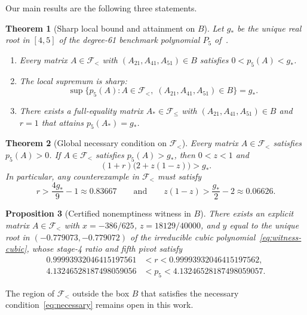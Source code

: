 \documentclass[11pt]{article}
\newtheorem{theorem}{Theorem}[section]
\newtheorem{proposition}[theorem]{Proposition}
\theoremstyle{remark}
\begin{document}
Our main results are the following three statements.

\begin{theorem}[Sharp local bound and attainment on $B$]\label{thm:box}
Let $g_*$ be the unique real root in $[4,5]$ of the degree-61 benchmark
polynomial $P_5$ of~\cite[eq.~(2.15)]{CEU2026}.
\begin{enumerate}
  \item Every matrix $A\in\mathcal{F}_{<}$ with $(A_{21},A_{41},A_{51})\in B$
  satisfies $0 < p_5(A) < g_*$.
  \item The local supremum is sharp:
  \[
    \sup\bigl\{p_5(A) : A\in\mathcal{F}_{<},\; (A_{21},A_{41},A_{51})\in B\bigr\} = g_*.
  \]
  \item There exists a full-equality matrix $A_*\in\mathcal{F}_{\le}$ with
  $(A_{21},A_{41},A_{51})\in B$ and $r=1$ that attains $p_5(A_*)=g_*$.
\end{enumerate}
\end{theorem}

\begin{theorem}[Global necessary condition on $\mathcal{F}_{<}$]\label{thm:global}
Every matrix $A\in\mathcal{F}_{<}$ satisfies $p_5(A)>0$. If $A\in\mathcal{F}_{<}$
satisfies $p_5(A) > g_*$, then $0 < z < 1$ and
\begin{equation}\label{eq:necessary}
  (1+r)\bigl(2+z(1-z)\bigr) > g_*.
\end{equation}
In particular, any counterexample in $\mathcal{F}_{<}$ must satisfy
\[
  r > \frac{4g_*}{9} - 1 \approx 0.83667
  \qquad\text{and}\qquad
  z(1-z) > \frac{g_*}{2} - 2 \approx 0.06626.
\]
\end{theorem}

\begin{proposition}[Certified nonemptiness witness in $B$]\label{prop:witness}
There exists an explicit matrix $A\in\mathcal{F}_{<}$ with
$x = -386/625$, $z = 18129/40000$, and $y$ equal to the unique root in
$(-0.779073,-0.779072)$ of the irreducible cubic polynomial~\eqref{eq:witness-cubic},
whose stage-4 ratio and fifth pivot satisfy
\begin{align*}
  0.99993932046415197561 &< r < 0.99993932046415197562, \\
  4.13246528187498059056 &< p_5 < 4.13246528187498059057.
\end{align*}
\end{proposition}

The region of $\mathcal{F}_{<}$ outside the box $B$ that satisfies the
necessary condition~\eqref{eq:necessary} remains open in this work.
\end{document}
